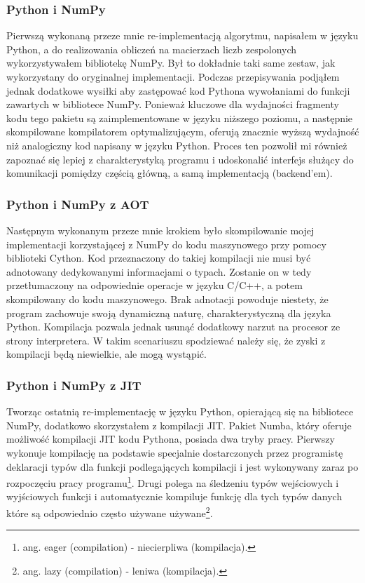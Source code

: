 \documentclass[11pt, a4paper]{article}
\begin{document}
\begin{sloppypar}
    \subsubsection{Python i NumPy}
    Pierwszą wykonaną przeze mnie re-implementacją algorytmu, napisałem w języku Python,
    a do realizowania obliczeń na macierzach liczb zespolonych wykorzystywałem bibliotekę
    NumPy. Był to dokładnie taki same zestaw, jak wykorzystany do oryginalnej implementacji.
    Podczas przepisywania podjąłem jednak dodatkowe wysiłki aby zastępować kod Pythona
    wywołaniami do funkcji zawartych w bibliotece NumPy. Ponieważ kluczowe dla wydajności
    fragmenty kodu tego pakietu są zaimplementowane w języku niższego poziomu, a
    następnie skompilowane kompilatorem optymalizującym, oferują znacznie wyższą wydajność
    niż analogiczny kod napisany w języku Python. Proces ten pozwolił mi również
    zapoznać się lepiej z charakterystyką programu i udoskonalić interfejs służący do
    komunikacji pomiędzy częścią główną, a samą implementacją (backend'em).

    \subsubsection{Python i NumPy z AOT}
    Następnym wykonanym przeze mnie krokiem było skompilowanie mojej implementacji korzystającej
    z NumPy do kodu maszynowego przy pomocy biblioteki Cython. Kod przeznaczony do
    takiej kompilacji nie musi być adnotowany dedykowanymi informacjami o typach. Zostanie
    on w tedy przetłumaczony na odpowiednie operacje w języku C/C++, a potem
    skompilowany do kodu maszynowego. Brak adnotacji powoduje niestety, że program
    zachowuje swoją dynamiczną naturę, charakterystyczną dla języka Python. Kompilacja
    pozwala jednak usunąć dodatkowy narzut na procesor ze strony interpretera. W takim scenariuszu
    spodziewać należy się, że zyski z kompilacji będą niewielkie, ale mogą wystąpić.

    \subsubsection{Python i NumPy z JIT}
    Tworząc ostatnią re-implementację w języku Python, opierającą się na bibliotece
    NumPy, dodatkowo skorzystałem z kompilacji JIT. Pakiet Numba, który oferuje możliwość
    kompilacji JIT kodu Pythona, posiada dwa tryby pracy. Pierwszy wykonuje kompilację na
    podstawie specjalnie dostarczonych przez programistę deklaracji typów dla funkcji podlegających
    kompilacji i jest wykonywany zaraz po rozpoczęciu pracy programu\footnote{ang. eager
    (compilation) - niecierpliwa (kompilacja).}. Drugi polega na śledzeniu typów
    wejściowych i wyjściowych funkcji i automatycznie kompiluje funkcję dla tych typów
    danych które są odpowiednio często używane używane\footnote{ang. lazy (compilation)
    - leniwa (kompilacja).}.


\end{sloppypar}
\end{document}
